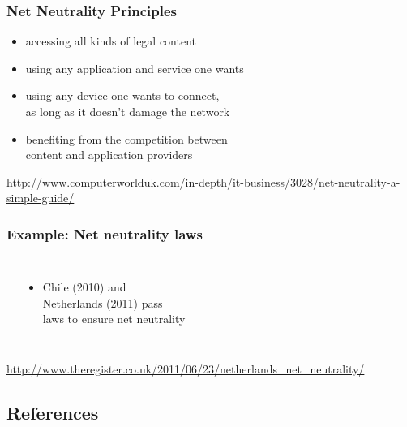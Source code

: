 \documentclass[dvipsnames]{beamer}
\theoremstyle{plain}
\begin{document}
\begin{frame}
  \frametitle{Net Neutrality Principles}

  \begin{itemize}
    \item accessing all kinds of legal content
    \item using any application and service one wants
    \item using any device one wants to connect,\\
      as long as it doesn't damage the network
    \item benefiting from the competition between\\
      content and application providers
  \end{itemize}

  \medskip
  \tiny{\url{http://www.computerworlduk.com/in-depth/it-business/3028/net-neutrality-a-simple-guide/}}\\
\end{frame}

\begin{frame}
  \frametitle{Example: Net neutrality laws}

  \begin{columns}
    \begin{center}
    \end{center}

    \begin{itemize}
      \item Chile (2010) and\\
        Netherlands (2011) pass\\
        laws to ensure net neutrality
    \end{itemize}
  \end{columns}

  \medskip
  \tiny{\url{http://www.theregister.co.uk/2011/06/23/netherlands_net_neutrality/}}\\
\end{frame}

\subsection*{References}
\end{document}
